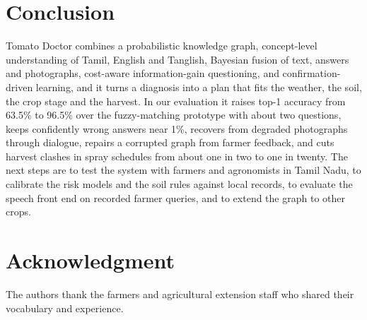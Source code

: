 \documentclass[conference]{IEEEtran}
\begin{document}
\section{Conclusion}

Tomato Doctor combines a probabilistic knowledge graph, concept-level understanding of Tamil, English and Tanglish, Bayesian fusion of text, answers and photographs, cost-aware information-gain questioning, and confirmation-driven learning, and it turns a diagnosis into a plan that fits the weather, the soil, the crop stage and the harvest. In our evaluation it raises top-1 accuracy from 63.5\% to 96.5\% over the fuzzy-matching prototype with about two questions, keeps confidently wrong answers near 1\%, recovers from degraded photographs through dialogue, repairs a corrupted graph from farmer feedback, and cuts harvest clashes in spray schedules from about one in two to one in twenty. The next steps are to test the system with farmers and agronomists in Tamil Nadu, to calibrate the risk models and the soil rules against local records, to evaluate the speech front end on recorded farmer queries, and to extend the graph to other crops.

\section*{Acknowledgment}
The authors thank the farmers and agricultural extension staff who shared their vocabulary and experience. %
\end{document}
